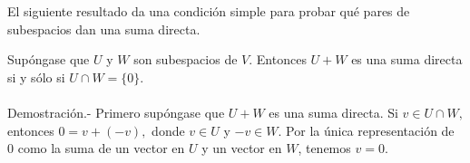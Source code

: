 El siguiente resultado da una condición simple para probar qué pares de subespacios dan una suma directa.\\

\begin{teo}
    Supóngase que $U$ y $W$ son subespacios de $V$. Entonces $U+W$ es una suma directa si y sólo si $U \cap W = \lbrace 0 \rbrace$.\\\\
    Demostración.-\; Primero supóngase que $U+W$ es una suma directa. Si $v \in U\cap W,$ entonces $0=v+(-v),$ donde $v\in U$ y $-v\in W$. Por la única representación de $0$ como la suma de un vector en $U$ y un vector en $W$, tenemos $v=0$. 
\end{teo}




